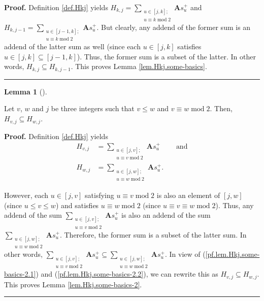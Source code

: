\documentclass[numbers=enddot,12pt,final,onecolumn,notitlepage]{scrartcl}%
\theoremstyle{definition}
\newtheorem{lem}[theo]{Lemma}
\newenvironment{lemma}[1][]
{\begin{lem}[#1]\begin{leftbar}}
{\end{leftbar}\end{lem}}
\newenvironment{proof}[1][Proof]{\noindent\textbf{#1.} }{\ \rule{0.5em}{0.5em}}
\let\sumnonlimits\sum
\renewcommand{\sum}{\sumnonlimits\limits}
\begin{document}
\begin{proof}
Definition \ref{def.Hkj} yields $H_{k,j}=\sum_{\substack{u\in\left[
j,k\right]  ;\\u\equiv k\operatorname{mod}2}}\mathbf{A}s_{u}^{+}$ and
$H_{k,j-1}=\sum_{\substack{u\in\left[  j-1,k\right]  ;\\u\equiv
k\operatorname{mod}2}}\mathbf{A}s_{u}^{+}$. But clearly, any addend of the
former sum is an addend of the latter sum as well (since each $u\in\left[
j,k\right]  $ satisfies $u\in\left[  j,k\right]  \subseteq\left[
j-1,k\right]  $). Thus, the former sum is a subset of the latter. In other
words, $H_{k,j}\subseteq H_{k,j-1}$. This proves Lemma
\ref{lem.Hkj.some-basics}.
\end{proof}

\begin{lemma}
\label{lem.Hkj.some-basics-2}Let $v$, $w$ and $j$ be three integers such that
$v\leq w$ and $v\equiv w\operatorname{mod}2$. Then, $H_{v,j}\subseteq H_{w,j}$.
\end{lemma}

\begin{proof}
Definition \ref{def.Hkj} yields%
\begin{align}
H_{v,j}  &  =\sum_{\substack{u\in\left[  j,v\right]  ;\\u\equiv
v\operatorname{mod}2}}\mathbf{A}s_{u}^{+}\ \ \ \ \ \ \ \ \ \ \text{and}%
\label{pf.lem.Hkj.some-basics-2.1}\\
H_{w,j}  &  =\sum_{\substack{u\in\left[  j,w\right]  ;\\u\equiv
w\operatorname{mod}2}}\mathbf{A}s_{u}^{+}. \label{pf.lem.Hkj.some-basics-2.2}%
\end{align}


However, each $u\in\left[  j,v\right]  $ satisfying $u\equiv
v\operatorname{mod}2$ is also an element of $\left[  j,w\right]  $ (since
$u\leq v\leq w$) and satisfies $u\equiv w\operatorname{mod}2$ (since $u\equiv
v\equiv w\operatorname{mod}2$). Thus, any addend of the sum $\sum
_{\substack{u\in\left[  j,v\right]  ;\\u\equiv v\operatorname{mod}%
2}}\mathbf{A}s_{u}^{+}$ is also an addend of the sum $\sum_{\substack{u\in
\left[  j,w\right]  ;\\u\equiv w\operatorname{mod}2}}\mathbf{A}s_{u}^{+}$.
Therefore, the former sum is a subset of the latter sum. In other words,
$\sum_{\substack{u\in\left[  j,v\right]  ;\\u\equiv v\operatorname{mod}%
2}}\mathbf{A}s_{u}^{+}\subseteq\sum_{\substack{u\in\left[  j,w\right]
;\\u\equiv w\operatorname{mod}2}}\mathbf{A}s_{u}^{+}$. In view of
(\ref{pf.lem.Hkj.some-basics-2.1}) and (\ref{pf.lem.Hkj.some-basics-2.2}), we
can rewrite this as $H_{v,j}\subseteq H_{w,j}$. This proves Lemma
\ref{lem.Hkj.some-basics-2}.
\end{proof}
\end{document}
